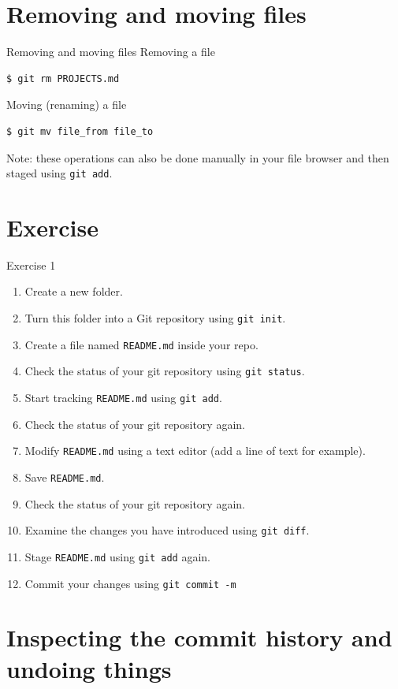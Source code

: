 \documentclass[handout]{beamer}
\begin{document}
\section{Removing and moving files}

\begin{frame}[fragile]{Removing and moving files}
Removing a file
\begin{lstlisting}
$ git rm PROJECTS.md
\end{lstlisting}
Moving (renaming) a file
\begin{lstlisting}
$ git mv file_from file_to
\end{lstlisting}
Note: these operations can also be done manually in your file browser and then staged using \texttt{git add}.
\end{frame}

\section{Exercise}

\begin{frame}{Exercise 1}
	\begin{enumerate}
		\item Create a new folder.
		\item Turn this folder into a Git repository using \texttt{git init}.
		\item Create a file named \texttt{README.md} inside your repo.
		\item Check the status of your git repository using \texttt{git status}.
		\item Start tracking \texttt{README.md} using \texttt{git add}.
		\item Check the status of your git repository again.
		\item Modify \texttt{README.md} using a text editor (add a line of text for example).
		\item Save \texttt{README.md}.
		\item Check the status of your git repository again.
		\item Examine the changes you have introduced using \texttt{git diff}.
		\item Stage \texttt{README.md} using \texttt{git add} again. 
		\item Commit your changes using \texttt{git commit -m}
	\end{enumerate}
\end{frame}

\section{Inspecting the commit history and undoing things}
\end{document}
